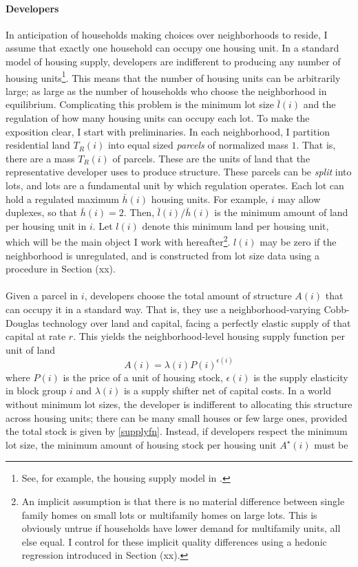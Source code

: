 \documentclass[]{article}
\begin{document}
\paragraph*{Developers}   
In anticipation of households making choices over neighborhoods to reside, I assume that exactly one household can occupy one housing unit. In a standard model of housing supply, developers are indifferent to producing any number of housing units\footnote{See, for example, the housing supply model in \cite{BSH}.}. This means that the number of housing units can be arbitrarily large; as large as the number of households who choose the neighborhood in equilibrium. Complicating this problem is the minimum lot size $\bar{l}(i)$ and the regulation of how many housing units can occupy each lot. To make the exposition clear, I start with preliminaries. In each neighborhood, I partition residential land $T_{R}(i)$ into equal sized \textit{parcels} of normalized mass $1$. That is, there are a mass $T_{R}(i)$ of parcels. These are the units of land that the representative developer uses to produce structure. These parcels can be \textit{split} into lots, and lots are a fundamental unit by which regulation operates. Each lot can hold a regulated maximum $\bar{h}(i)$ housing units. For example, $i$ may allow duplexes, so that $\bar{h}(i) = 2$. Then, $\bar{l}(i)/\bar{h}(i)$ is the minimum amount of land per housing unit in $i$. Let $l(i)$ denote this minimum land per housing unit, which will be the main object I work with hereafter\footnote{An implicit assumption is that there is no material difference between single family homes on small lots or multifamily homes on large lots. This is obviously untrue if households have lower demand for multifamily units, all else equal. I control for these implicit quality differences using a hedonic regression introduced in Section (xx).}. $l(i)$ may be zero if the neighborhood is unregulated, and is constructed from lot size data using a procedure in Section (xx). 

\paragraph*{}
Given a parcel in $i$, developers choose the total amount of structure $A(i)$ that can occupy it in a standard way. That is, they use a neighborhood-varying Cobb-Douglas technology over land and capital, facing a perfectly elastic supply of that capital at rate $r$. This yields the neighborhood-level housing supply function per unit of land
\begin{equation}\label{supplyfn}
	A(i) = \lambda(i)P(i)^{\epsilon(i)}
\end{equation}
where $P(i)$ is the price of a unit of housing stock, $\epsilon(i)$ is the supply elasticity in block group $i$ and $\lambda(i)$ is a supply shifter net of capital costs. In a world without minimum lot sizes, the developer is indifferent to allocating this structure across housing units; there can be many small houses or few large ones, provided the total stock is given by \eqref{supplyfn}. Instead, if developers respect the minimum lot size, the minimum amount of housing stock per housing unit $A^{\star}(i)$ must be
\end{document}
